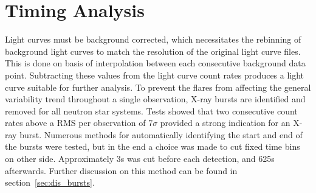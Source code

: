 \section{Timing Analysis}
\label{sec:timing_analysis}
Light curves must be background corrected, which necessitates the rebinning of background light curves to match the resolution of the original light curve files. This is done on basis of interpolation between each consecutive background data point. Subtracting these values from the light curve count rates produces a light curve suitable for further analysis. To prevent the flares from affecting the general variability trend throughout a single observation, X-ray bursts are identified and removed for all neutron star systems. Tests showed that two consecutive count rates above a \acf{RMS} per observation of 7$\sigma$ provided a strong indication for an X-ray burst. Numerous methods for automatically identifying the start and end of the bursts were tested, but in the end a choice was made to cut fixed time bins on other side. Approximately 3s was cut before each detection, and 625s afterwards. Further discussion on this method can be found in section~\ref{sec:dis_bursts}.\\

